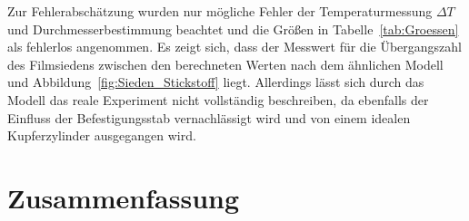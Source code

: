 \documentclass[parskip=half, a4paper,twoside,final]{article}
\begin{document}
Zur Fehlerabschätzung wurden nur mögliche Fehler der Temperaturmessung $\Delta T$ und Durchmesserbestimmung beachtet und die Größen in Tabelle~\ref{tab:Groessen} als fehlerlos angenommen. Es zeigt sich, dass der Messwert für die Übergangszahl des Filmsiedens zwischen den berechneten Werten nach dem ähnlichen Modell und Abbildung~\ref{fig:Sieden_Stickstoff} liegt. Allerdings lässt sich durch das Modell das reale Experiment nicht vollständig beschreiben, da ebenfalls der Einfluss der Befestigungsstab vernachlässigt wird und von einem idealen Kupferzylinder ausgegangen wird.
\newpage
\section{Zusammenfassung}


{}

\end{document}
